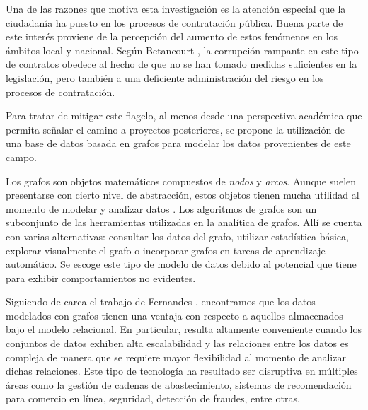 \documentclass[11pt,letterpaper,oneside]{article}
\begin{document}
	Una de las razones que motiva esta investigación es la atención especial que la ciudadanía ha puesto en los procesos de contratación pública. Buena parte de este interés proviene de la percepción del aumento de estos fenómenos en los ámbitos local y nacional. Según Betancourt \cite{Betancourt-2018}, la corrupción rampante en este tipo de contratos obedece al hecho de que no se han tomado medidas suficientes en la legislación, pero también a una deficiente administración del riesgo en los procesos de contratación.
	
	Para tratar de mitigar este flagelo, al menos desde una perspectiva académica que permita señalar el camino a proyectos posteriores, se propone la utilización de una base de datos basada en grafos para modelar los datos provenientes de este campo.
	
	Los grafos son objetos matemáticos compuestos de {\em nodos} y {\em arcos}. Aunque suelen presentarse con cierto nivel de abstracción, estos objetos tienen mucha utilidad al momento de modelar y analizar datos \cite{Needham-2019}. Los algoritmos de grafos son un subconjunto de las herramientas utilizadas en la analítica de grafos. Allí se cuenta con varias alternativas: consultar los datos del grafo, utilizar estadística básica, explorar visualmente el grafo o incorporar grafos en tareas de aprendizaje automático. Se escoge este tipo de modelo de datos debido al potencial que tiene para exhibir comportamientos no evidentes.
	
	Siguiendo de carca el trabajo de Fernandes \cite{Fernandes-2018}, encontramos que los datos modelados con grafos tienen una ventaja con respecto a aquellos almacenados bajo el modelo relacional. En particular, resulta altamente conveniente cuando los conjuntos de datos exhiben alta escalabilidad y las relaciones entre los datos es compleja de manera que se requiere mayor flexibilidad al momento de analizar dichas relaciones. Este tipo de tecnología ha resultado ser disruptiva en múltiples áreas como la gestión de cadenas de abastecimiento, sistemas de recomendación para comercio en línea, seguridad, detección de fraudes, entre otras.
	
\end{document}
